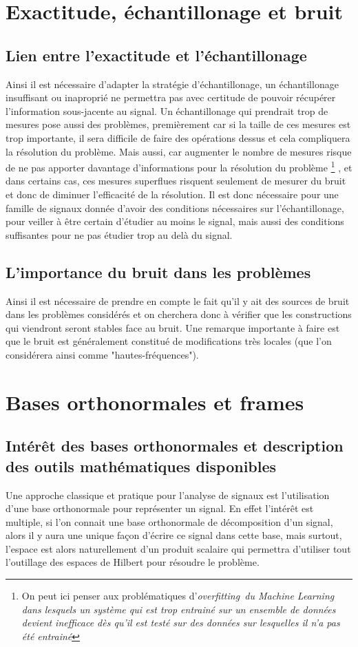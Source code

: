 \section{Exactitude, échantillonage et bruit}
\subsection{Lien entre l'exactitude et l'échantillonage}
Ainsi il est nécessaire d'adapter la stratégie d'échantillonage, un échantillonage insuffisant ou inaproprié ne permettra pas avec certitude de pouvoir récupérer l'information sous-jacente au signal.
Un échantillonage qui prendrait trop de mesures pose aussi des problèmes, premièrement car si la taille de ces mesures est trop importante, il sera difficile de faire des opérations dessus et cela compliquera la résolution du problème. 
Mais aussi, car augmenter le nombre de mesures risque de ne pas apporter davantage d'informations pour la résolution du problème \footnote{On peut ici penser aux problématiques d'\it{overfitting} du Machine Learning dans lesquels un système qui est trop entrainé sur un ensemble de données devient inefficace dès qu'il est testé sur des données sur lesquelles il n'a pas été entrainé}
, et dans certains cas, ces mesures superflues risquent seulement de mesurer du bruit et donc de diminuer l'efficacité de la résolution.
Il est donc nécessaire pour une famille de signaux donnée d'avoir des conditions nécessaires sur l'échantillonage, pour veiller à être certain d'étudier au moins le signal, mais aussi des conditions suffisantes pour ne pas étudier trop au delà du signal.
\subsection{L'importance du bruit dans les problèmes}
Ainsi il est nécessaire de prendre en compte le fait qu'il y ait des sources de bruit dans les problèmes considérés et on cherchera donc à vérifier que les constructions qui viendront seront stables face au bruit.
Une remarque importante à faire est que le bruit est généralement constitué de modifications très locales (que l'on considérera ainsi comme "hautes-fréquences").

\section{Bases orthonormales et frames}
\subsection{Intérêt des bases orthonormales et description des outils mathématiques disponibles}
Une approche classique et pratique pour l'analyse de signaux est l'utilisation d'une base orthonormale pour représenter un signal. 
En effet l'intérêt est multiple, si l'on connait une base orthonormale de décomposition d'un signal, alors il y aura une unique façon d'écrire ce signal dans cette base, mais surtout, l'espace est alors naturellement d'un produit scalaire qui permettra d'utiliser tout l'outillage des espaces de Hilbert pour résoudre le problème.

